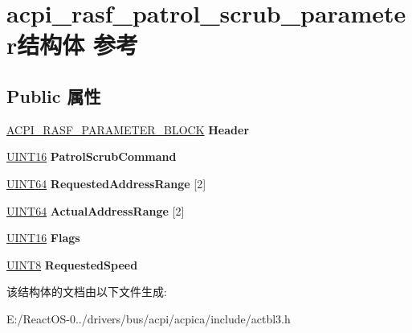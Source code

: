 \hypertarget{structacpi__rasf__patrol__scrub__parameter}{}\section{acpi\+\_\+rasf\+\_\+patrol\+\_\+scrub\+\_\+parameter结构体 参考}
\label{structacpi__rasf__patrol__scrub__parameter}
\subsection*{Public 属性}
\begin{DoxyCompactItemize}
\item 
\mbox{\label{structacpi__rasf__patrol__scrub__parameter_aa9c3d78892f614d0b32191a77da9b7d9}} 
\hyperlink{structacpi__rasf__parameter__block}{A\+C\+P\+I\+\_\+\+R\+A\+S\+F\+\_\+\+P\+A\+R\+A\+M\+E\+T\+E\+R\+\_\+\+B\+L\+O\+CK} {\bfseries Header}
\item 
\mbox{\label{structacpi__rasf__patrol__scrub__parameter_a886ebe556b5dce170241ae7de88ef0b6}} 
\hyperlink{_processor_bind_8h_a09f1a1fb2293e33483cc8d44aefb1eb1}{U\+I\+N\+T16} {\bfseries Patrol\+Scrub\+Command}
\item 
\mbox{\label{structacpi__rasf__patrol__scrub__parameter_a9f9986e0050df30aa97e64daa0f10d10}} 
\hyperlink{_processor_bind_8h_a57be03562867144161c1bfee95ca8f7c}{U\+I\+N\+T64} {\bfseries Requested\+Address\+Range} \mbox{[}2\mbox{]}
\item 
\mbox{\label{structacpi__rasf__patrol__scrub__parameter_ad4702312cc945fb53f0d77605c08740d}} 
\hyperlink{_processor_bind_8h_a57be03562867144161c1bfee95ca8f7c}{U\+I\+N\+T64} {\bfseries Actual\+Address\+Range} \mbox{[}2\mbox{]}
\item 
\mbox{\label{structacpi__rasf__patrol__scrub__parameter_a0df6b0ac9ea460611bda44006c093ee9}} 
\hyperlink{_processor_bind_8h_a09f1a1fb2293e33483cc8d44aefb1eb1}{U\+I\+N\+T16} {\bfseries Flags}
\item 
\mbox{\label{structacpi__rasf__patrol__scrub__parameter_a29157aa3c4d77effbdb42a6f065e1d26}} 
\hyperlink{_processor_bind_8h_ab27e9918b538ce9d8ca692479b375b6a}{U\+I\+N\+T8} {\bfseries Requested\+Speed}
\end{DoxyCompactItemize}


该结构体的文档由以下文件生成\+:\begin{DoxyCompactItemize}
\item 
E\+:/\+React\+O\+S-\/0../drivers/bus/acpi/acpica/include/actbl3.\+h\end{DoxyCompactItemize}
